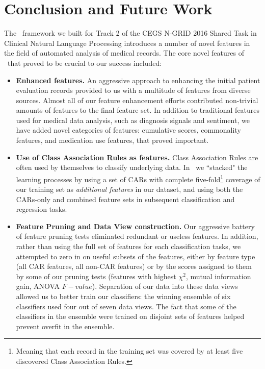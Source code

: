 \chapter{Conclusion and Future Work}\label{sec:conclusion}


The \CREATE\ framework we built for Track 2 of the CEGS N-GRID 2016 Shared Task in Clinical Natural Language Processing introduces a number of novel features in the
field of automated analysis of medical records. The core novel
features of \CREATE\ that proved to be crucial to our success included:

\begin{itemize}
\item \textbf{Enhanced features.} An aggressive approach to enhancing the
initial patient evaluation records provided to us with a multitude of features
from diverse sources. Almost all of our feature enhancement efforts 
contributed non-trivial amounts of features to the final feature set. In addition
to traditional features used for medical data analysis, such as diagnosis signals and sentiment, we have added novel categories of features: cumulative scores, commonality
features, and medication use features, that proved important.

\item \textbf{Use of Class Association Rules as features.} Class Association Rules
are often used by themselves to classify underlying data. In \CREATE\ we ``stacked"
the learning processes by using a set of CARs with complete five-fold\footnote{Meaning
that each record in the training set was covered by at least five discovered
Class Association Rules.} coverage of our training set as \textit{additional features} 
in our dataset, and using both the CARs-only and combined feature sets in
subsequent classification and regression tasks.

\item \textbf{Feature Pruning and Data View construction.} Our aggressive
battery of feature pruning tests eliminated redundant or useless features.
In addition, rather than using the full set of features for each classification
tasks, we attempted to zero in on useful subsets of the features, either by
feature type (all CAR features, all non-CAR features) or by the scores
assigned to them by some of our pruning tests (features with highest
$\chi^2$, mutual information gain, ANOVA $F-value$). Separation of our
data into these data views allowed us to better train our classifiers:
the winning ensemble of six classifiers used four out of seven data views.
The fact that some of the classifiers in the ensemble were trained
on disjoint sets of features helped prevent overfit in the ensemble.


\end{itemize}
